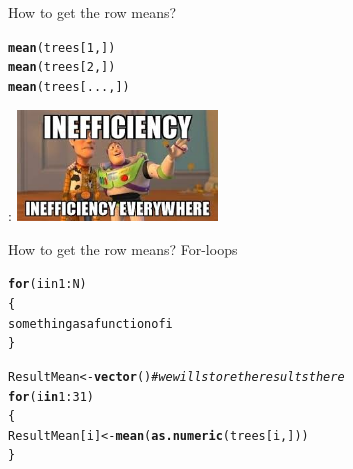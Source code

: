\documentclass[10pt]{beamer}\usepackage[]{graphicx}\usepackage[]{color}
\makeatletter
\newcommand{\hlnum}[1]{\textcolor[rgb]{0.686,0.059,0.569}{#1}}%
\newcommand{\hlcom}[1]{\textcolor[rgb]{0.678,0.584,0.686}{\textit{#1}}}%
\newcommand{\hlopt}[1]{\textcolor[rgb]{0,0,0}{#1}}%
\newcommand{\hlstd}[1]{\textcolor[rgb]{0.345,0.345,0.345}{#1}}%
\newcommand{\hlkwa}[1]{\textcolor[rgb]{0.161,0.373,0.58}{\textbf{#1}}}%
\newcommand{\hlkwb}[1]{\textcolor[rgb]{0.69,0.353,0.396}{#1}}%
\newcommand{\hlkwd}[1]{\textcolor[rgb]{0.737,0.353,0.396}{\textbf{#1}}}%
\newenvironment{kframe}{%
 \def\at@end@of@kframe{}%
 \ifinner\ifhmode%
  \def\at@end@of@kframe{\end{minipage}}%
  \begin{minipage}{\columnwidth}%
 \fi\fi%
 \def\FrameCommand##1{\hskip\@totalleftmargin \hskip-\fboxsep
 \colorbox{shadecolor}{##1}\hskip-\fboxsep
     \hskip-\linewidth \hskip-\@totalleftmargin \hskip\columnwidth}%
 \MakeFramed {\advance\hsize-\width
   \@totalleftmargin\z@ \linewidth\hsize
   \@setminipage}}%
 {\par\unskip\endMakeFramed%
 \at@end@of@kframe}
\newenvironment{knitrout}{}{} %
\makeatother
\begin{document}
\begin{frame}[fragile]{How to get the row means?}
\begin{knitrout}
\color{fgcolor}\begin{kframe}
\begin{alltt}
\hlkwd{mean}\hlstd{(trees[}\hlnum{1}\hlstd{,])}
\hlkwd{mean}\hlstd{(trees[}\hlnum{2}\hlstd{,])}
\hlkwd{mean}\hlstd{(trees[...,])}
\end{alltt}
\end{kframe}
\end{knitrout}
  \pause
  \begin{center}:
    \includegraphics[width=0.4\textwidth]{Figures/ineff}
  \end{center}
\end{frame}

\begin{frame}[fragile]{How to get the row means? For-loops}

\begin{knitrout}
\color{fgcolor}\begin{kframe}
\begin{alltt}
  \hlkwd{for} (i in 1:N)
  \{
    something as a function of i
  \}
\end{alltt}
\end{kframe}
\end{knitrout}
  
  \pause
\begin{knitrout}
\color{fgcolor}\begin{kframe}
\begin{alltt}
\hlstd{ResultMean} \hlkwb{<-} \hlkwd{vector}\hlstd{()} \hlcom{# we will store the results there}
\hlkwa{for} \hlstd{(i} \hlkwa{in} \hlnum{1}\hlopt{:}\hlnum{31}\hlstd{)}
\hlstd{\{}
  \hlstd{ResultMean[i]} \hlkwb{<-} \hlkwd{mean}\hlstd{(}\hlkwd{as.numeric}\hlstd{(trees[i,]))}
\hlstd{\}}
\end{alltt}
\end{kframe}
\end{knitrout}
  
\end{frame}
\end{document}
